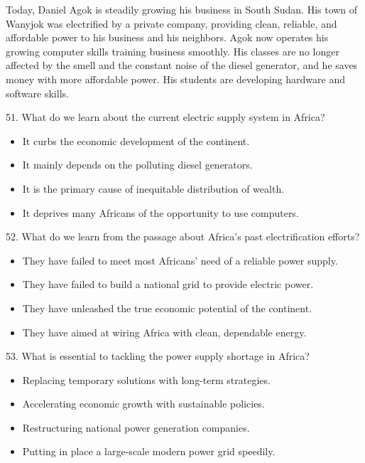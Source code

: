 \documentclass[UTF8,11pt]{ctexart}
\begin{document}
Today, Daniel Agok is steadily growing his business in South Sudan. His town of Wanyjok was electrified by a private company, providing clean, reliable, and affordable power to his business and his neighbors. Agok now operates his growing computer skills training business smoothly. His classes are no longer affected by the smell and the constant noise of the diesel generator, and he saves money with more affordable power. His students are developing hardware and software skills.


51. What do we learn about the current electric supply system in Africa?


\begin{itemize}[leftmargin=2em,itemsep=.2em,topsep=.4em]\item[A.] It curbs the economic development of the continent.
\item[B.] It mainly depends on the polluting diesel generators.
\item[C.] It is the primary cause of inequitable distribution of wealth.
\item[D.] It deprives many Africans of the opportunity to use computers.
\end{itemize}

52. What do we learn from the passage about Africa’s past electrification efforts?


\begin{itemize}[leftmargin=2em,itemsep=.2em,topsep=.4em]\item[A.] They have failed to meet most Africans’ need of a reliable power supply.
\item[B.] They have failed to build a national grid to provide electric power.
\item[C.] They have unleashed the true economic potential of the continent.
\item[D.] They have aimed at wiring Africa with clean, dependable energy.
\end{itemize}

53. What is essential to tackling the power supply shortage in Africa?


\begin{itemize}[leftmargin=2em,itemsep=.2em,topsep=.4em]\item[A.] Replacing temporary solutions with long-term strategies.
\item[B.] Accelerating economic growth with sustainable policies.
\item[C.] Restructuring national power generation companies.
\item[D.] Putting in place a large-scale modern power grid speedily.
\end{itemize}
\end{document}
